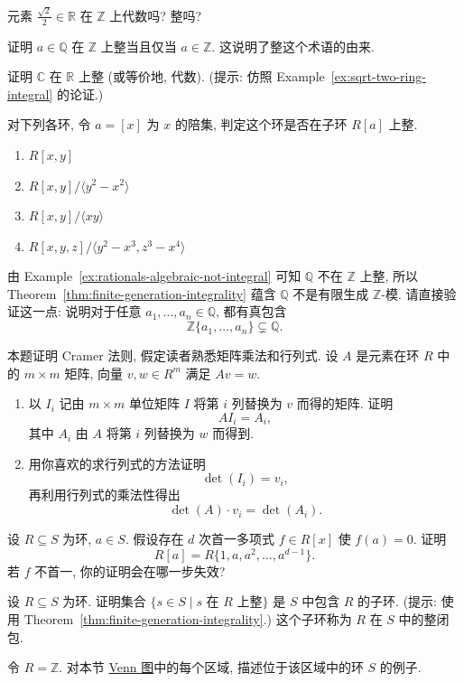 \BookExerciseHeading
\begin{BookExercises}
  \item\label{ex:square-root-of-two-root-test} 元素 $\frac{\sqrt{2}}{2}\in\mathbb{R}$ 在 $\mathbb{Z}$ 上代数吗? 整吗?
  \item\label{ex:rational-integral-iff-integer} 证明 $a\in\mathbb{Q}$ 在 $\mathbb{Z}$ 上整当且仅当 $a\in\mathbb{Z}$. 这说明了\textquotedbl{}整\textquotedbl{}这个术语的由来.
  \item\label{ex:complex-integral-over-real} 证明 $\mathbb{C}$ 在 $\mathbb{R}$ 上整 (或等价地, 代数). (提示: 仿照 Example~\ref{ex:sqrt-two-ring-integral} 的论证.)
  \item\label{ex:classify-integral-polynomial-quotients} 对下列各环, 令 $a=[x]$ 为 $x$ 的陪集, 判定这个环是否在子环 $R[a]$ 上整.
    \begin{enumerate}[label=(\alph*)]
      \item $R[x,y]$
      \item $R[x,y]/\langle y^{2}-x^{2}\rangle$
      \item $R[x,y]/\langle xy\rangle$
      \item $R[x,y,z]/\langle y^{2}-x^{3},z^{3}-x^{4}\rangle$
    \end{enumerate}
  \item\label{ex:rationals-not-finite-module-direct} 由 Example~\ref{ex:rationals-algebraic-not-integral} 可知 $\mathbb{Q}$ 不在 $\mathbb{Z}$ 上整, 所以 Theorem~\ref{thm:finite-generation-integrality} 蕴含 $\mathbb{Q}$ 不是有限生成 $\mathbb{Z}$-模. 请直接验证这一点: 说明对于任意 $a_{1},\ldots,a_{n}\in\mathbb{Q}$, 都有真包含
    \[
      \mathbb{Z}\{a_{1},\ldots,a_{n}\}\subsetneq\mathbb{Q}.
    \]
  \item\label{ex:determinant-cramer-rule} 本题证明 Cramer 法则, 假定读者熟悉矩阵乘法和行列式. 设 $A$ 是元素在环 $R$ 中的 $m\times m$ 矩阵, 向量 $v,w\in R^{m}$ 满足 $Av=w$.
    \begin{enumerate}[label=(\alph*)]
      \item 以 $I_{i}$ 记由 $m\times m$ 单位矩阵 $I$ 将第 $i$ 列替换为 $v$ 而得的矩阵. 证明
        \[
          AI_{i}=A_{i},
        \]
        其中 $A_{i}$ 由 $A$ 将第 $i$ 列替换为 $w$ 而得到.
      \item 用你喜欢的求行列式的方法证明
        \[
          \det(I_{i})=v_{i},
        \]
        再利用行列式的乘法性得出
        \[
          \det(A)\cdot v_{i}=\det(A_{i}).
        \]
    \end{enumerate}
  \item\label{ex:monic-relation-bounds-module-powers} 设 $R\subseteq S$ 为环, $a\in S$. 假设存在 $d$ 次首一多项式 $f\in R[x]$ 使 $f(a)=0$. 证明
    \[
      R[a]=R\{1,a,a^{2},\ldots,a^{d-1}\}.
    \]
    若 $f$ 不首一, 你的证明会在哪一步失效?
  \item\label{ex:integral-closure-is-subring} 设 $R\subseteq S$ 为环. 证明集合 $\{s\in S\mid s\text{ 在 $R$ 上整}\}$ 是 $S$ 中包含 $R$ 的子环. (提示: 使用 Theorem~\ref{thm:finite-generation-integrality}.) 这个子环称为 $R$ 在 $S$ 中的整闭包.
  \item\label{ex:integrality-venn-regions} 令 $R=\mathbb{Z}$. 对本节 \hyperref[fig:integrality-venn-diagram]{Venn 图}中的每个区域, 描述位于该区域中的环 $S$ 的例子.
\end{BookExercises}
